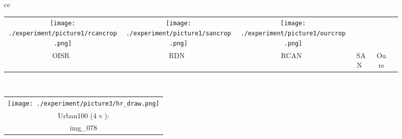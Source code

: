\documentclass[10pt,twocolumn,letterpaper]{article}
\newcommand{\widthscalefive}{0.145}
\begin{document}
\begin{figure*}[htbp]
\begin{tabular}{cc}
\begin{adjustbox}{valign=t}
\begin{tabular}{cccccc}
				\texttt{[image: ./experiment/picture1/rcancrop.png]} \hspace{\fsdttwofigBD} &
				\texttt{[image: ./experiment/picture1/sancrop.png]} \hspace{\fsdttwofigBD} &
				\texttt{[image: ./experiment/picture1/ourcrop.png]}  
				\\ 
				OISR~\cite{he2019ode} \hspace{\fsdttwofigBD} &
				RDN~\cite{zhang2018residual} \hspace{\fsdttwofigBD} &
				RCAN~\cite{zhang2018image} \hspace{\fsdttwofigBD} &
				SAN~\cite{dai2019second}  \hspace{\fsdttwofigBD} &
				Ours 
			 \hspace{\fsdttwofigBD} 
				\\
			\end{tabular}
		\end{adjustbox}
		\vspace{0.5mm}
		\\

		\begin{adjustbox}{valign=t}
\begin{tabular}{c}
				\texttt{[image: ./experiment/picture3/hr\_draw.png]}
				\\
				 Urban100 ($4\times$):
				\\
				img\_078



\end{tabular}
\end{adjustbox}
\end{tabular}
\end{figure*}
\end{document}
